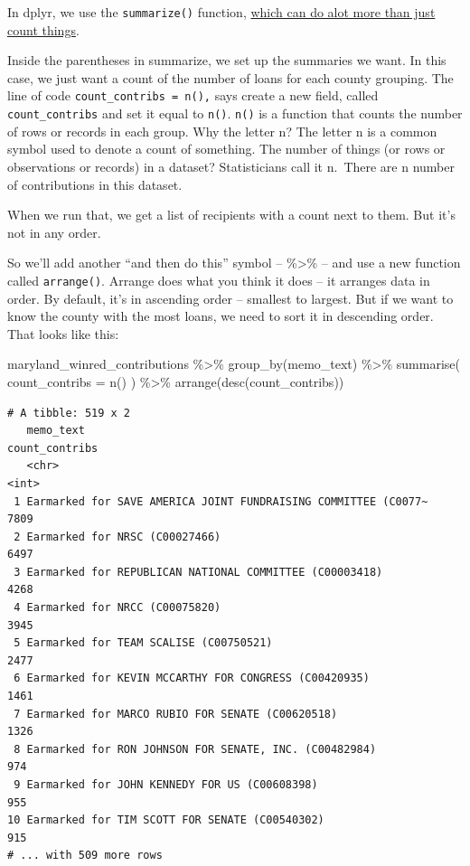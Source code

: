 \documentclass[
  letterpaper,
  DIV=11,
  numbers=noendperiod]{scrreprt}
\newenvironment{Shaded}{\begin{snugshade}}{\end{snugshade}}
\newcommand{\AttributeTok}[1]{\textcolor[rgb]{0.40,0.45,0.13}{#1}}
\newcommand{\FunctionTok}[1]{\textcolor[rgb]{0.28,0.35,0.67}{#1}}
\newcommand{\NormalTok}[1]{\textcolor[rgb]{0.00,0.23,0.31}{#1}}
\newcommand{\SpecialCharTok}[1]{\textcolor[rgb]{0.37,0.37,0.37}{#1}}
\begin{document}
In dplyr, we use the \texttt{summarize()} function,
\href{http://dplyr.tidyverse.org/reference/summarise.html}{which can do
alot more than just count things}.

Inside the parentheses in summarize, we set up the summaries we want. In
this case, we just want a count of the number of loans for each county
grouping. The line of code \texttt{count\_contribs\ =\ n(),} says create
a new field, called \texttt{count\_contribs} and set it equal to
\texttt{n()}. \texttt{n()} is a function that counts the number of rows
or records in each group. Why the letter n? The letter n is a common
symbol used to denote a count of something. The number of things (or
rows or observations or records) in a dataset? Statisticians call it
n.~There are n number of contributions in this dataset.

When we run that, we get a list of recipients with a count next to them.
But it's not in any order.

So we'll add another ``and then do this'' symbol -- \%\textgreater\% --
and use a new function called \texttt{arrange()}. Arrange does what you
think it does -- it arranges data in order. By default, it's in
ascending order -- smallest to largest. But if we want to know the
county with the most loans, we need to sort it in descending order. That
looks like this:

\begin{Shaded}
\begin{Highlighting}[]
\NormalTok{maryland\_winred\_contributions }\SpecialCharTok{\%\textgreater{}\%}
  \FunctionTok{group\_by}\NormalTok{(memo\_text) }\SpecialCharTok{\%\textgreater{}\%}
  \FunctionTok{summarise}\NormalTok{(}
    \AttributeTok{count\_contribs =} \FunctionTok{n}\NormalTok{()}
\NormalTok{  ) }\SpecialCharTok{\%\textgreater{}\%}
  \FunctionTok{arrange}\NormalTok{(}\FunctionTok{desc}\NormalTok{(count\_contribs))}
\end{Highlighting}
\end{Shaded}

\begin{verbatim}
# A tibble: 519 x 2
   memo_text                                                      count_contribs
   <chr>                                                                   <int>
 1 Earmarked for SAVE AMERICA JOINT FUNDRAISING COMMITTEE (C0077~           7809
 2 Earmarked for NRSC (C00027466)                                           6497
 3 Earmarked for REPUBLICAN NATIONAL COMMITTEE (C00003418)                  4268
 4 Earmarked for NRCC (C00075820)                                           3945
 5 Earmarked for TEAM SCALISE (C00750521)                                   2477
 6 Earmarked for KEVIN MCCARTHY FOR CONGRESS (C00420935)                    1461
 7 Earmarked for MARCO RUBIO FOR SENATE (C00620518)                         1326
 8 Earmarked for RON JOHNSON FOR SENATE, INC. (C00482984)                    974
 9 Earmarked for JOHN KENNEDY FOR US (C00608398)                             955
10 Earmarked for TIM SCOTT FOR SENATE (C00540302)                            915
# ... with 509 more rows
\end{verbatim}
\end{document}
